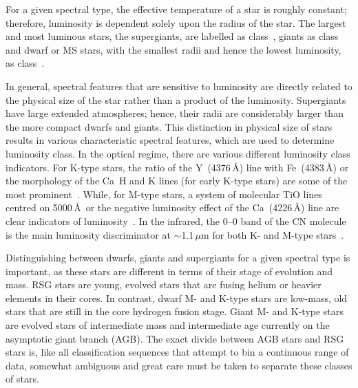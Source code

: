 For a given spectral type, the effective temperature of a star is roughly constant; therefore, luminosity is dependent solely upon the radius of the star.
The largest and most luminous stars, the supergiants, are labelled as class~\1, giants as class~\3 and dwarf or MS stars, with the smallest radii and hence the lowest luminosity, as class~\5.

In general, spectral features that are sensitive to luminosity are directly related to the physical size of the star rather than a product of the luminosity.
Supergiants have large extended atmospheres; hence, their radii are considerably larger than the more compact dwarfs and giants.
This distinction in physical size of stars results in various characteristic spectral features, which are used to determine luminosity class.
In the optical regime, there are various different luminosity class indicators.
For K-type stars, the ratio of the Y\,\2 (4376\,\AA) line with Fe\,\1 (4383\,\AA) or the morphology of the Ca\,\2 H and K lines (for early K-type stars) are some of the most prominent~\citep{b:GrayCorbally}.
While, for M-type stars, a system of molecular TiO lines centred on 5000\,\AA ~or the negative luminosity effect of the Ca\,\1 (4226\,\AA) line are clear indicators of luminosity~\citep{b:GrayCorbally}.
In the infrared, the 0--0 band of the CN molecule is the main luminosity discriminator at $\sim$1.1\,$\mu$m for both K- and M-type stars~\citep{b:GrayCorbally}.




Distinguishing between dwarfs, giants and supergiants for a given spectral type is important, as these stars are different in terms of their stage of evolution and mass.
RSG stars are young, evolved stars that are fusing helium or heavier elements in their cores.
In contrast, dwarf M- and K-type stars are low-mass, old stars that are still in the core hydrogen fusion stage.
Giant M- and K-type stars are evolved stars of intermediate mass and intermediate age currently on the asymptotic giant branch (AGB).
The exact divide between AGB stars and RSG stars is, like all classification sequences that attempt to bin a continuous range of data, somewhat ambiguous and great care must be taken to separate these classes of stars.

